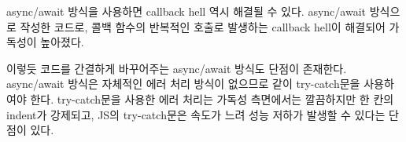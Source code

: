 async/await 방식을 사용하면 callback hell 역시 해결될 수 있다. \는 \을 async/await 방식으로 작성한 코드로, 콜백 함수의 반복적인 호출로 발생하는 callback hell이 해결되어 가독성이 높아졌다.

이렇듯 코드를 간결하게 바꾸어주는 async/await 방식도 단점이 존재한다. async/await 방식은 자체적인 에러 처리 방식이 없으므로 \과 같이 try-catch문을 사용하여야 한다. try-catch문을 사용한 에러 처리는 가독성 측면에서는 깔끔하지만 한 칸의 indent가 강제되고, JS의 try-catch문은 속도가 느려 성능 저하가 발생할 수 있다는 단점이 있다.
